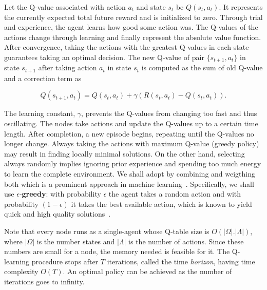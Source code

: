  
 
Let the Q-value associated with action $a_t$ and state $s_t$ be $Q(s_t, a_t)$. It represents the currently expected total future reward and  is initialized to zero. 
Through trial and experience, the agent learns how good some action was. The Q-values of
the actions change through learning and finally represent the absolute value function. After
convergence, taking the actions with the greatest Q-values in each state guarantees taking an 
optimal decision. The new Q-value of pair $\{s_{t+1}, a_t\}$ in state $s_{t+1}$ after taking action $a_t$ in state $s_t$ is computed
as the sum of old Q-value and a correction term as 

$$
Q(s_{t+1}, a_t) = Q(s_t, a_t) + \gamma(R(s_t, a_t) - Q(s_t, a_t)). $$


The learning constant, $\gamma$, prevents the Q-values from changing too
fast and thus oscillating. The nodes take actions  and update the Q-values up to a certain time length.  After completion, a new episode begins, repeating until the Q-values no longer
change. Always taking the actions with maximum
Q-value (greedy policy) may result in finding locally minimal solutions. On the other
hand, selecting always randomly implies ignoring prior experience and
spending too much energy to learn the complete environment. We shall adopt by combining and weigthing both which is a prominent approach in machine learning~\cite{RLBook}. Specifically, we shall use $\epsilon$-{\bf greedy}: with probability $\epsilon$ the agent takes a random action and with
probability $(1 - \epsilon)$ it takes the best available action, which is known to yield quick and high quality solutions~\cite{RLBook}. 
  
 
 
  Note that every node runs as a single-agent whose Q-table size is $O(|\Omega | . |\Lambda|)$, where $|\Omega |$ is the number states and $|\Lambda|$ is the number of actions. Since these numbers are small for a node, the memory needed is feasible for it. The Q-learning procedure stops after $T$ iterations, called the time {\slshape horizon}, having time complexity $O(T)$. An optimal policy can be achieved as the number of iterations goes to infinity.  




 
       

          